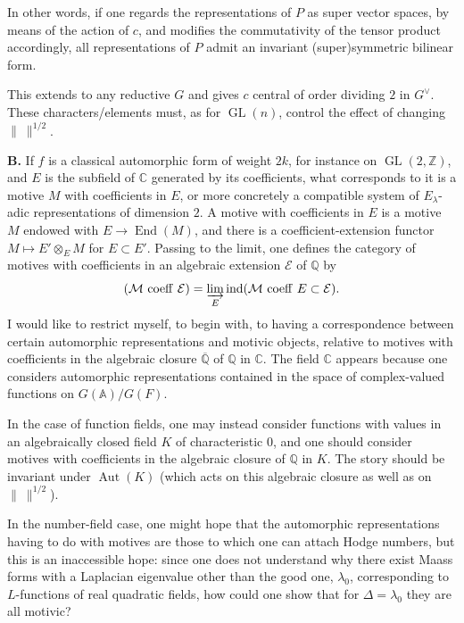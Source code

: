 \documentclass[11pt]{article}
\newcommand{\GL}{\operatorname{GL}}
\newcommand{\End}{\operatorname{End}}
\newcommand{\Aut}{\operatorname{Aut}}
\newcommand{\ind}{\operatorname{ind}}
\newcommand{\A}{\mathbb A}
\newcommand{\normchar}{\|\ \|}
\begin{document}
In other words, if one regards the representations of \(P\) as super vector spaces, by means of the action of \(c\), and modifies the commutativity of the tensor product accordingly, all representations of \(P\) admit an invariant (super)symmetric bilinear form.

This extends to any reductive \(G\) and gives \(c\) central of order dividing \(2\) in \(G^\vee\). These characters/elements must, as for \(\GL(n)\), control the effect of changing \(\normchar^{1/2}\).

\textbf{B.} If \(f\) is a classical automorphic form of weight \(2k\), for instance on \(\GL(2,\mathbb Z)\), and \(E\) is the subfield of \(\mathbb C\) generated by its coefficients, what corresponds to it is a motive \(M\) with coefficients in \(E\), or more concretely a compatible system of \(E_\lambda\)-adic representations of dimension \(2\). A motive with coefficients in \(E\) is a motive \(M\) endowed with \(E\to\End(M)\), and there is a coefficient-extension functor \(M\mapsto E'\otimes_E M\) for \(E\subset E'\). Passing to the limit, one defines the category of motives with coefficients in an algebraic extension \(\mathcal E\) of \(\mathbb Q\) by
\[
(\mathcal M\ \mathrm{coeff}\ \mathcal E)=\varinjlim_E \ind(\mathcal M\ \mathrm{coeff}\ E\subset\mathcal E).
\]
I would like to restrict myself, to begin with, to having a correspondence between certain automorphic representations and motivic objects, relative to motives with coefficients in the algebraic closure \(\overline{\mathbb Q}\) of \(\mathbb Q\) in \(\mathbb C\). The field \(\mathbb C\) appears because one considers automorphic representations contained in the space of complex-valued functions on \(G(\A)/G(F)\).

In the case of function fields, one may instead consider functions with values in an algebraically closed field \(K\) of characteristic \(0\), and one should consider motives with coefficients in the algebraic closure of \(\mathbb Q\) in \(K\). The story should be invariant under \(\Aut(K)\) (which acts on this algebraic closure as well as on \(\normchar^{1/2}\)).

In the number-field case, one might hope that the automorphic representations having to do with motives are those to which one can attach Hodge numbers, but this is an inaccessible hope: since one does not understand why there exist Maass forms with a Laplacian eigenvalue other than the good one, \(\lambda_0\), corresponding to \(L\)-functions of real quadratic fields, how could one show that for \(\Delta=\lambda_0\) they are all motivic?
\end{document}
